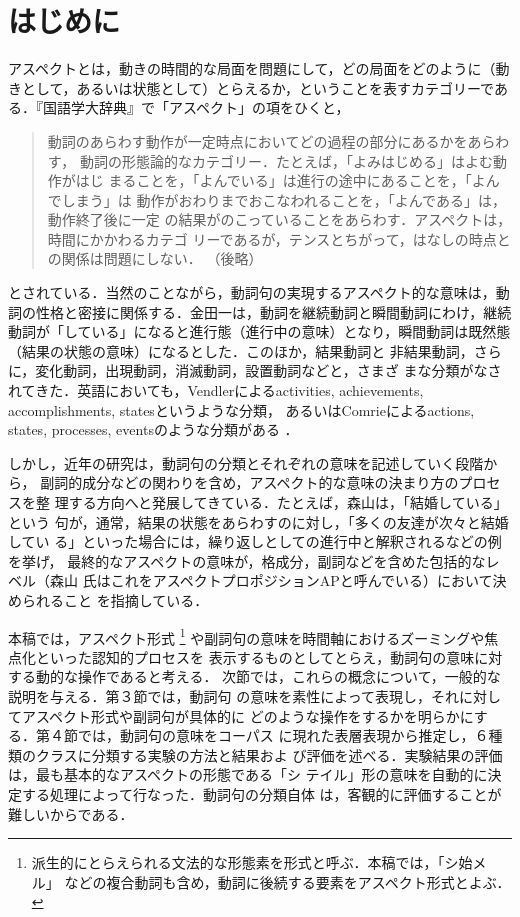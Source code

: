 

\maketitle

\section{はじめに}

アスペクトとは，動きの時間的な局面を問題にして，どの局面をどのように（動
きとして，あるいは状態として）とらえるか，ということを表すカテゴリーであ
る．『国語学大辞典』\cite{Kokugo93}で「アスペクト」の項をひくと，
\begin{quotation}
  動詞のあらわす動作が一定時点においてどの過程の部分にあるかをあらわす，
  動詞の形態論的なカテゴリー．たとえば，「よみはじめる」はよむ動作がはじ
  まることを，「よんでいる」は進行の途中にあることを，「よんでしまう」は
  動作がおわりまでおこなわれることを，「よんである」は，動作終了後に一定
  の結果がのこっていることをあらわす．アスペクトは，時間にかかわるカテゴ
  リーであるが，テンスとちがって，はなしの時点との関係は問題にしない．
  （後略）
\end{quotation}
とされている．当然のことながら，動詞句の実現するアスペクト的な意味は，動
詞の性格と密接に関係する．金田一は，動詞を継続動詞と瞬間動詞にわけ，継続
動詞が「している」になると進行態（進行中の意味）となり，瞬間動詞は既然態
（結果の状態の意味）になるとした\cite{Kindaiti76}．このほか，結果動詞と
非結果動詞，さらに，変化動詞，出現動詞，消滅動詞，設置動詞などと，さまざ
まな分類がなされてきた．英語においても，Vendlerによるactivities,
achievements, accomplishments, statesというような分類\cite{Vendler57}，
あるいはComrieによるactions, states, processes, eventsのような分類がある
\cite{Comrie76}．

しかし，近年の研究は，動詞句の分類とそれぞれの意味を記述していく段階から，
副詞的成分などの関わりを含め，アスペクト的な意味の決まり方のプロセスを整
理する方向へと発展してきている．たとえば，森山は，「結婚している」という
句が，通常，結果の状態をあらわすのに対し，「多くの友達が次々と結婚してい
る」といった場合には，繰り返しとしての進行中と解釈されるなどの例を挙げ，
最終的なアスペクトの意味が，格成分，副詞などを含めた包括的なレベル（森山
氏はこれをアスペクトプロポジションAPと呼んでいる）において決められること
を指摘している\cite{森山83,森山88}．

本稿では，アスペクト形式
\footnote{
  派生的にとらえられる文法的な形態素を形式と呼ぶ．本稿では，「シ始メル」
  などの複合動詞も含め，動詞に後続する要素をアスペクト形式とよぶ．
}
や副詞句の意味を時間軸におけるズーミングや焦点化といった認知的プロセスを
表示するものとしてとらえ，動詞句の意味に対する動的な操作であると考える．
次節では，これらの概念について，一般的な説明を与える．第３節では，動詞句
の意味を素性によって表現し，それに対してアスペクト形式や副詞句が具体的に
どのような操作をするかを明らかにする．第４節では，動詞句の意味をコーパス
に現れた表層表現から推定し，６種類のクラスに分類する実験の方法と結果およ
び評価を述べる．実験結果の評価は，最も基本的なアスペクトの形態である「シ
テイル」形の意味を自動的に決定する処理によって行なった．動詞句の分類自体
は，客観的に評価することが難しいからである．

